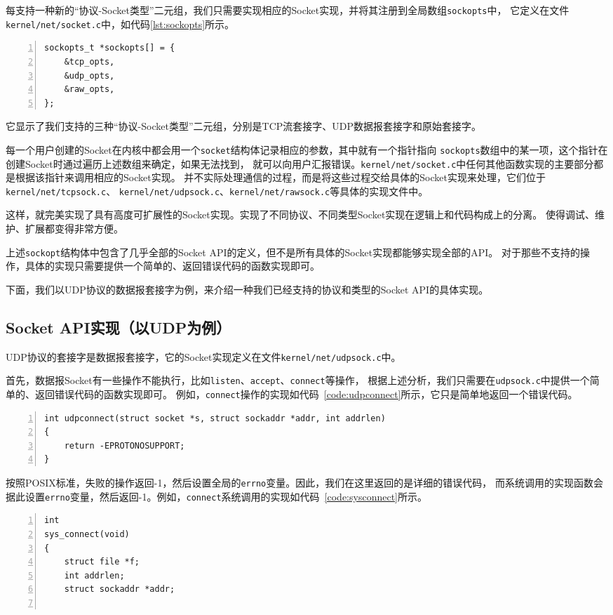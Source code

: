 \documentclass[a4paper,twoside]{ctexrep}
\begin{document}
\begin{spacing}{1.2}
每支持一种新的“协议-Socket类型”二元组，我们只需要实现相应的Socket实现，并将其注册到全局数组\texttt{sockopts}中，
它定义在文件\texttt{kernel/net/socket.c}中，如代码\ref{lst:sockopts}所示。
\begin{lstlisting}[numbers=left,style=CppStyle,caption=sockopts数组,label={code:sockopts}]
sockopts_t *sockopts[] = {
	&tcp_opts,
	&udp_opts,
	&raw_opts,
};
\end{lstlisting}
它显示了我们支持的三种“协议-Socket类型”二元组，分别是TCP流套接字、UDP数据报套接字和原始套接字。

每一个用户创建的Socket在内核中都会用一个\texttt{socket}结构体记录相应的参数，其中就有一个指针指向
\texttt{sockopts}数组中的某一项，这个指针在创建Socket时通过遍历上述数组来确定，如果无法找到，
就可以向用户汇报错误。\texttt{kernel/net/socket.c}中任何其他函数实现的主要部分都是根据该指针来调用相应的Socket实现。
并不实际处理通信的过程，而是将这些过程交给具体的Socket实现来处理，它们位于\texttt{kernel/net/tcpsock.c}、
\texttt{kernel/net/udpsock.c}、\texttt{kernel/net/rawsock.c}等具体的实现文件中。

这样，就完美实现了具有高度可扩展性的Socket实现。实现了不同协议、不同类型Socket实现在逻辑上和代码构成上的分离。
使得调试、维护、扩展都变得非常方便。

上述\texttt{sockopt}结构体中包含了几乎全部的Socket API的定义，但不是所有具体的Socket实现都能够实现全部的API。
对于那些不支持的操作，具体的实现只需要提供一个简单的、返回错误代码的函数实现即可。

下面，我们以UDP协议的数据报套接字为例，来介绍一种我们已经支持的协议和类型的Socket API的具体实现。

\subsection{Socket API实现（以UDP为例）}

UDP协议的套接字是数据报套接字，它的Socket实现定义在文件\texttt{kernel/net/udpsock.c}中。

首先，数据报Socket有一些操作不能执行，比如\texttt{listen}、\texttt{accept}、\texttt{connect}等操作，
根据上述分析，我们只需要在\texttt{udpsock.c}中提供一个简单的、返回错误代码的函数实现即可。
例如，\texttt{connect}操作的实现如代码~\ref{code:udpconnect}所示，它只是简单地返回一个错误代码。
\begin{lstlisting}[numbers=left,style=CppStyle,caption=UDP的\texttt{connect}实现,label={code:udpconnect}]
int udpconnect(struct socket *s, struct sockaddr *addr, int addrlen)
{
	return -EPROTONOSUPPORT;
}
\end{lstlisting}
按照POSIX标准，失败的操作返回-1，然后设置全局的\texttt{errno}变量。因此，我们在这里返回的是详细的错误代码，
而系统调用的实现函数会据此设置\texttt{errno}变量，然后返回-1。例如，\texttt{connect}系统调用的实现如代码~\ref{code:sysconnect}所示。
\begin{lstlisting}[numbers=left,style=CppStyle,caption=\texttt{connect}系统调用实现,label={code:sysconnect}]
int
sys_connect(void)
{
	struct file *f;
	int addrlen;
	struct sockaddr *addr;


\end{lstlisting}
\end{spacing}
\end{document}
